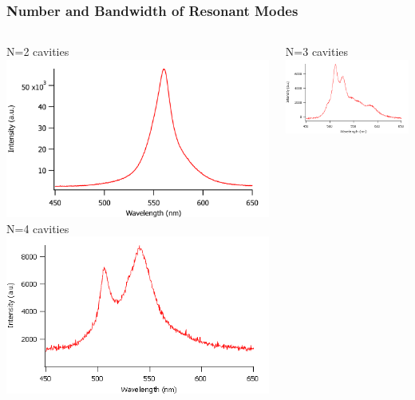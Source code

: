 \documentclass{beamer}
\begin{document}
        \begin{frame}
            \frametitle{Number and Bandwidth of Resonant Modes}
            \begin{columns}
				\begin{column}{0.5\textwidth}
					\centering
					N=2 cavities\\
					\includegraphics[width=\textwidth]{images/n2_fe.png}\\
					N=4 cavities\\
					\includegraphics[width=\textwidth]{images/n4_fe.png}
				\end{column}
				\begin{column}{0.5\textwidth}
					\centering
					N=3 cavities\\
					\includegraphics[width=\textwidth]{images/n3_fe.png}\\

\end{column}
\end{columns}
\end{frame}
\end{document}
